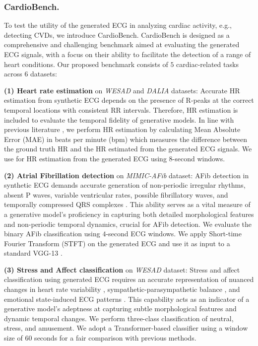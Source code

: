 \documentclass[letterpaper]{article} %
\begin{document}
\subsubsection{CardioBench.}
To test the utility of the generated ECG in analyzing cardiac activity, e.g., detecting CVDs, we introduce CardioBench. CardioBench is designed as a comprehensive and challenging benchmark aimed at evaluating the generated ECG signals, with a focus on their ability to facilitate the detection of a range of heart conditions. Our proposed benchmark consists of $5$ cardiac-related tasks across $6$ datasets:

    \textbf{(1) Heart rate estimation} on \textit{WESAD} \cite{schmidt2018introducing} and \textit{DALIA} \cite{reiss2019deep} datasets: Accurate HR estimation from synthetic ECG depends on the presence of R-peaks at the correct temporal locations with consistent RR intervals. Therefore, HR estimation is included to evaluate the temporal fidelity of generative models. In line with previous literature \cite{sarkar2021cardiogan}, we perform HR estimation by calculating Mean Absolute Error (MAE) in beats per minute (bpm) which measures the difference between the ground truth HR and the HR estimated from the generated ECG signals. We use \cite{hamilton2002open} for HR estimation from the generated ECG using $8$-second windows.

    \textbf{(2) Atrial Fibrillation detection} on \textit{MIMIC-AFib} \cite{bashar2019noise} dataset:
    AFib detection in synthetic ECG demands accurate generation of non-periodic irregular rhythms, absent P waves, variable ventricular rates, possible fibrillatory waves, and temporally compressed QRS complexes \cite{burnsguidelines}. This ability serves as a vital measure of a generative model's proficiency in capturing both detailed morphological features and non-periodic temporal dynamics, crucial for AFib detection. We evaluate the binary AFib classification using $4$-second ECG windows. We apply  Short-time Fourier Transform (STFT) on the generated ECG and use it as input to a standard VGG-13 \cite{sallem2020detection}.

    \textbf{(3) Stress and Affect classification} on \textit{WESAD} \cite{schmidt2018introducing} dataset: Stress and affect classification using generated ECG requires an accurate representation of nuanced changes in heart rate variability \cite{kim2018stress}, sympathetic-parasympathetic balance \cite{tewari2006sympathetic}, and emotional state-induced ECG patterns \cite{sarkar2020self}. This capability acts as an indicator of a generative model's adeptness at capturing subtle morphological features and dynamic temporal changes. We perform three-class classification of neutral, stress, and amusement. We adopt a Transformer-based classifier \cite{behinaein2021transformer} using a window size of $60$ seconds for a fair comparison with previous methods.
\end{document}
